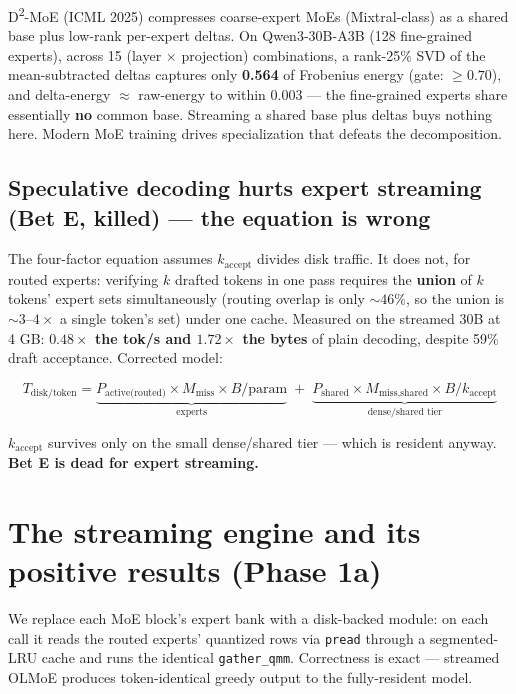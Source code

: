 \documentclass[11pt]{article}
\begin{document}
D\textsuperscript{2}-MoE (ICML 2025) compresses coarse-expert MoEs (Mixtral-class) as a shared base plus low-rank per-expert deltas. On Qwen3-30B-A3B (128 fine-grained experts), across 15 (layer $\times$ projection) combinations, a rank-25\% SVD of the mean-subtracted deltas captures only \textbf{0.564} of Frobenius energy (gate: ${\ge}0.70$), and delta-energy $\approx$ raw-energy to within 0.003 --- the fine-grained experts share essentially \textbf{no} common base. Streaming a shared base plus deltas buys nothing here. Modern MoE training drives specialization that defeats the decomposition.

\subsection{Speculative decoding hurts expert streaming (Bet E, killed) --- the equation is wrong}
\label{sec:speculative}

The four-factor equation assumes $k_{\text{accept}}$ divides disk traffic. It does not, for routed experts: verifying $k$ drafted tokens in one pass requires the \textbf{union} of $k$ tokens' expert sets simultaneously (routing overlap is only ${\sim}46\%$, so the union is ${\sim}3$--$4\times$ a single token's set) under one cache. Measured on the streamed 30B at 4 GB: \textbf{$0.48\times$ the tok/s and $1.72\times$ the bytes} of plain decoding, despite 59\% draft acceptance. Corrected model:

\begin{equation}
T_{\text{disk/token}} = \underbrace{P_{\text{active(routed)}} \times M_{\text{miss}} \times B/\text{param}}_{\text{experts}} \;+\; \underbrace{P_{\text{shared}} \times M_{\text{miss,shared}} \times B / k_{\text{accept}}}_{\text{dense/shared tier}}
\end{equation}

\noindent $k_{\text{accept}}$ survives only on the small dense/shared tier --- which is resident anyway. \textbf{Bet E is dead for expert streaming.}

\section{The streaming engine and its positive results (Phase 1a)}
\label{sec:engine}

We replace each MoE block's expert bank with a disk-backed module: on each call it reads the routed experts' quantized rows via \texttt{pread} through a segmented-LRU cache and runs the identical \texttt{gather\_qmm}. Correctness is exact --- streamed OLMoE produces token-identical greedy output to the fully-resident model.
\end{document}
